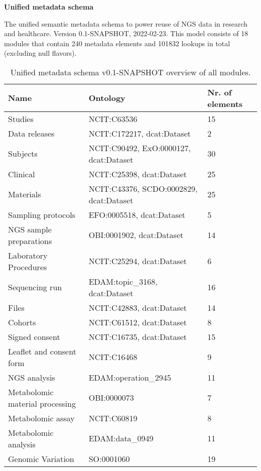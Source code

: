 \documentclass{article}
\begin{document}
\setlength\parindent{0pt}

\textbf{Unified metadata schema}
\newline

The unified semantic metadata schema to power reuse of NGS data in research and healthcare. Version 0.1-SNAPSHOT, 2022-02-23. This model consists of 18 modules that contain 240 metadata elements and 101832 lookups in total (excluding null flavors).

\begin{table}[htb]
\begin{tabular}{lll}
Name & Ontology & Nr. of elements \\
\hline
Studies & NCIT:C63536  & 15 \\
Data releases & NCIT:C172217, dcat:Dataset  & 2 \\
Subjects & NCIT:C90492, ExO:0000127, dcat:Dataset  & 30 \\
Clinical & NCIT:C25398, dcat:Dataset  & 25 \\
Materials & NCIT:C43376, SCDO:0002829, dcat:Dataset  & 25 \\
Sampling protocols & EFO:0005518, dcat:Dataset  & 5 \\
NGS sample preparations & OBI:0001902, dcat:Dataset  & 14 \\
Laboratory Procedures & NCIT:C25294, dcat:Dataset  & 6 \\
Sequencing run & EDAM:topic\_3168, dcat:Dataset  & 16 \\
Files & NCIT:C42883, dcat:Dataset  & 14 \\
Cohorts & NCIT:C61512, dcat:Dataset  & 8 \\
Signed consent & NCIT:C16735, dcat:Dataset  & 15 \\
Leaflet and consent form & NCIT:C16468  & 9 \\
NGS analysis & EDAM:operation\_2945  & 11 \\
Metabolomic material processing & OBI:0000073  & 7 \\
Metabolomic assay & NCIT:C60819  & 8 \\
Metabolomic analysis & EDAM:data\_0949  & 11 \\
Genomic Variation & SO:0001060  & 19 \\
\hline
\end{tabular}
\caption[Module overview]{\label{table:table1} Unified metadata schema v0.1-SNAPSHOT overview of all modules.}
\end{table}
\end{document}
